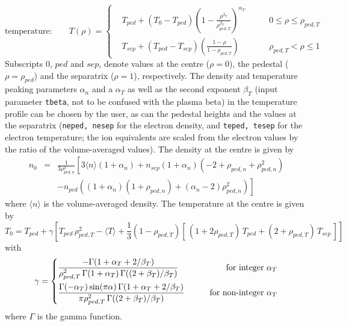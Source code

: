 \documentclass[11pt,a4paper]{report}
\begin{document}
\begin{equation}
\mbox{temperature:} \qquad T(\rho) = \left\{ 
\begin{aligned}
  &T_{ped} + (T_0 - T_{ped}) \left( 1 - \frac{\rho^{\beta_T}}
    {\rho_{ped,T}^{\beta_T}}\right)^{\alpha_T} &\qquad 0 \leq \rho \leq \rho_{ped,T} \\
  &T_{sep} + (T_{ped} - T_{sep})\left( \frac{1- \rho}{1-\rho_{ped,T}}\right)
  &\qquad \rho_{ped,T} < \rho \leq 1
\end{aligned}
\right.
\end{equation}
Subscripts $0$, $ped$ and $sep$, denote values at the centre ($\rho = 0$), the
pedestal ($\rho = \rho_{ped}$) and the separatrix ($\rho=1$),
respectively. The density and temperature peaking parameters $\alpha_n$ and a
$\alpha_T$ as well as the second exponent $\beta_T$ (input parameter
\texttt{tbeta}, not to be confused with the plasma beta) in the temperature
profile can be chosen by the user, as can the pedestal heights and the values
at the separatrix (\texttt{neped, nesep} for the electron density, and
\texttt{teped, tesep} for the electron temperature; the ion equivalents are
scaled from the electron values by the ratio of the volume-averaged values).
The density at the centre is given by
\begin{eqnarray}
  \nonumber
  n_0 &= & \frac{1}{3\rho_{ped,n}^2} \left[3\langle n\rangle (1+\alpha_n)
    + n_{sep} (1+\alpha_n) (-2 + \rho_{ped,n} + \rho_{ped,n}^2) \right.\\
  && \left. - n_{ped}\left( (1 + \alpha_n)(1+ \rho_{ped,n}) + (\alpha_n -2)
    \rho_{ped,n}^2 \right) \right]
\end{eqnarray}
where $\langle n \rangle$ is the volume-averaged density. The temperature at
the centre is given by
\begin{equation}
T_0 = T_{ped} + \gamma \left[ T_{ped}\, \rho_{ped,T}^2 - \langle T \rangle +
  \frac{1}{3}(1 - \rho_{ped,T}) \left[ \, (1 + 2\rho_{ped,T}) \, T_{ped} + ( 2 +
    \rho_{ped,T}) \, T_{sep} \, \right] \right]
\end{equation}
with 
\begin{equation}
\gamma = \left\{ 
\begin{aligned}
  &\frac{ -\Gamma(1+\alpha_T+2/\beta_T)}
  {\rho_{ped,T}^2 \, \Gamma(1+\alpha_T) \, \Gamma((2+\beta_T)/\beta_T)}
  &\qquad \textnormal{for integer } \alpha_T \\
  &\frac{\Gamma(-\alpha_T)\sin(\pi\alpha)\, \Gamma(1+\alpha_T+2/\beta_T)}
  {\pi\rho_{ped,T}^2 \, \Gamma((2+\beta_T)/\beta_T)}
  &\qquad \textnormal{for non-integer } \alpha_T
\end{aligned}
\right.
\end{equation}
where $\Gamma$ is the gamma function.
\end{document}
